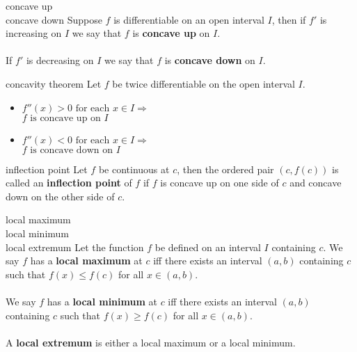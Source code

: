 \documentclass[avery5371,grid]{flashcards}
\begin{document}
\begin{flashcard}[Definition]{concave up\\concave down}
Suppose $f$ is differentiable on an open interval $I$, then
if $f'$ is increasing on $I$ we say that $f$ is \textbf{concave up} on $I$.
\\
\\
If $f'$ is decreasing on $I$ we say that $f$ is \textbf{concave down} on $I$. 
\end{flashcard}

\begin{flashcard}[Theorem]{concavity theorem}
Let $f$ be twice differentiable on the open interval $I$.
\begin{itemize}
\item $f''(x)>0 \text{ for each } x \in I \Rightarrow$\\
$f \text{ is concave up on } I$ 
\item $f''(x)<0 \text{ for each } x \in I \Rightarrow$\\
$f \text{ is concave down on } I$ 
\end{itemize}
\end{flashcard}

\begin{flashcard}[Definition]{inflection point}
Let $f$ be continuous at $c$, then the ordered pair $(c,f(c))$ is
called an \textbf{inflection point} of $f$ if $f$ is concave up on
one side of $c$ and concave down on the other side of $c$.
\end{flashcard}

\begin{flashcard}[definition]{local maximum\\local minimum\\local extremum}
Let the function $f$ be defined on an interval $I$ containing $c$.  We say
$f$ has a \textbf{local maximum} at $c$ iff there exists an
interval $(a,b)$ containing $c$ such that $f(x) \leq f(c)$ for all $x \in (a,b)$.
\\ \\
We say $f$ has a \textbf{local minimum} at $c$ iff there exists an
interval $(a,b)$ containing $c$ such that $f(x) \geq f(c)$ for all $x \in (a,b)$.
\\ \\
A \textbf{local extremum} is either a local maximum or a local
minimum.
\end{flashcard}
\end{document}
